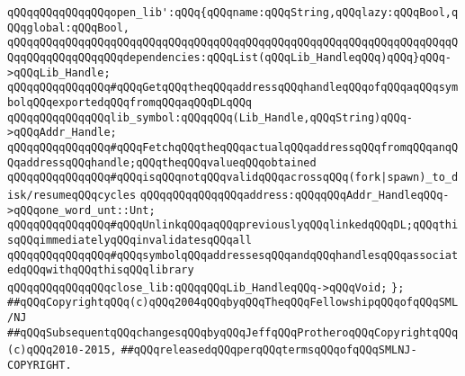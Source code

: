 \verb|qQQqqQQqqQQqqQQqopen_lib':qQQq{qQQqname:qQQqString,qQQqlazy:qQQqBool,qQQqglobal:qQQqBool,|\newline
\verb|qQQqqQQqqQQqqQQqqQQqqQQqqQQqqQQqqQQqqQQqqQQqqQQqqQQqqQQqqQQqqQQqqQQqqQQqqQQqqQQqqQQqqQQqdependencies:qQQqList(qQQqLib_HandleqQQq)qQQq}qQQq->qQQqLib_Handle;|\newline
\newline
\verb|qQQqqQQqqQQqqQQq#qQQqGetqQQqtheqQQqaddressqQQqhandleqQQqofqQQqaqQQqsymbolqQQqexportedqQQqfromqQQqaqQQqDLqQQq|\newline
\verb|qQQqqQQqqQQqqQQqlib_symbol:qQQqqQQq(Lib_Handle,qQQqString)qQQq->qQQqAddr_Handle;|\newline
\newline
\verb|qQQqqQQqqQQqqQQq#qQQqFetchqQQqtheqQQqactualqQQqaddressqQQqfromqQQqanqQQqaddressqQQqhandle;qQQqtheqQQqvalueqQQqobtained|\newline
\verb|qQQqqQQqqQQqqQQq#qQQqisqQQqnotqQQqvalidqQQqacrossqQQq(fork|\verb#|spawn)_to_disk/resumeqQQqcycles#\newline
\verb|qQQqqQQqqQQqqQQqaddress:qQQqqQQqAddr_HandleqQQq->qQQqone_word_unt::Unt;|\newline
\newline
\verb|qQQqqQQqqQQqqQQq#qQQqUnlinkqQQqaqQQqpreviouslyqQQqlinkedqQQqDL;qQQqthisqQQqimmediatelyqQQqinvalidatesqQQqall|\newline
\verb|qQQqqQQqqQQqqQQq#qQQqsymbolqQQqaddressesqQQqandqQQqhandlesqQQqassociatedqQQqwithqQQqthisqQQqlibrary|\newline
\verb|qQQqqQQqqQQqqQQqclose_lib:qQQqqQQqLib_HandleqQQq->qQQqVoid;|\newline
\verb|};|\newline
\newline
\newline
\verb|##qQQqCopyrightqQQq(c)qQQq2004qQQqbyqQQqTheqQQqFellowshipqQQqofqQQqSML/NJ|\newline
\verb|##qQQqSubsequentqQQqchangesqQQqbyqQQqJeffqQQqProtheroqQQqCopyrightqQQq(c)qQQq2010-2015,|\newline
\verb|##qQQqreleasedqQQqperqQQqtermsqQQqofqQQqSMLNJ-COPYRIGHT.|\newline

